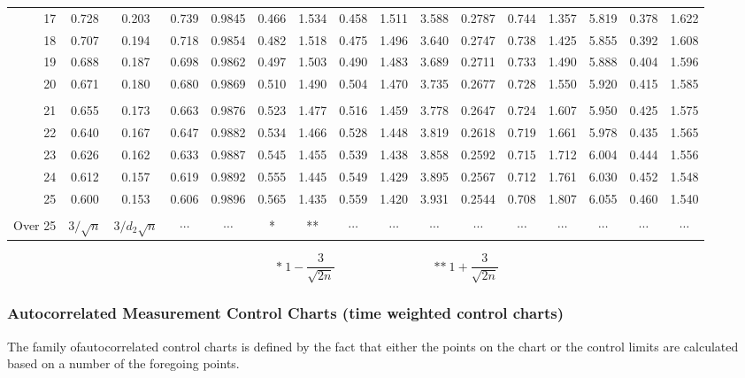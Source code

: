 \begin{center}
{\begin{tabular}{|r|c|c|c|c|c|c|c|c|c|c|c|c|c|c|c|}
	    17 & 0.728 & 0.203 & 0.739 & 0.9845 & 0.466 & 1.534 & 0.458 & 1.511
	       & 3.588 & 0.2787 & 0.744 & 1.357 & 5.819 & 0.378 & 1.622 \\
	    18 & 0.707 & 0.194 & 0.718 & 0.9854 & 0.482 & 1.518 & 0.475 & 1.496
	       & 3.640 & 0.2747 & 0.738 & 1.425 & 5.855 & 0.392 & 1.608 \\
	    19 & 0.688 & 0.187 & 0.698 & 0.9862 & 0.497 & 1.503 & 0.490 & 1.483
	       & 3.689 & 0.2711 & 0.733 & 1.490 & 5.888 & 0.404 & 1.596 \\
	    20 & 0.671 & 0.180 & 0.680 & 0.9869 & 0.510 & 1.490 & 0.504 & 1.470
	       & 3.735 & 0.2677 & 0.728 & 1.550 & 5.920 & 0.415 & 1.585 \\
	       &       &        &       &       &       &       &       &
	       &       &        &       &       &       &       &       \\
	    21 & 0.655 & 0.173 & 0.663 & 0.9876 & 0.523 & 1.477 & 0.516 & 1.459
	       & 3.778 & 0.2647 & 0.724 & 1.607 & 5.950 & 0.425 & 1.575 \\
	    22 & 0.640 & 0.167 & 0.647 & 0.9882 & 0.534 & 1.466 & 0.528 & 1.448
	       & 3.819 & 0.2618 & 0.719 & 1.661 & 5.978 & 0.435 & 1.565 \\
	    23 & 0.626 & 0.162 & 0.633 & 0.9887 & 0.545 & 1.455 & 0.539 & 1.438
	       & 3.858 & 0.2592 & 0.715 & 1.712 & 6.004 & 0.444 & 1.556 \\
	    24 & 0.612 & 0.157 & 0.619 & 0.9892 & 0.555 & 1.445 & 0.549 & 1.429
	       & 3.895 & 0.2567 & 0.712 & 1.761 & 6.030 & 0.452 & 1.548 \\
	    25 & 0.600 & 0.153 & 0.606 & 0.9896 & 0.565 & 1.435 & 0.559 & 1.420
	       & 3.931 & 0.2544 & 0.708 & 1.807 & 6.055 & 0.460 & 1.540 \\
	       &       &        &       &       &       &       &       &
	       &       &        &       &       &       &       &       \\
	    Over 25 & $3/\sqrt{n}$ & $3/d_2\sqrt{n}$ & $\cdots$ & $\cdots$ & * & ** 
	       & $\cdots$ & $\cdots$ & $\cdots$ & $\cdots$ & $\cdots$ & $\cdots$ 
	       & $\cdots$ & $\cdots$ & $\cdots$ \\ \hline
	  \end{tabular}}
	  \[ *\ 1-\frac{3}{\sqrt{2n}} \qquad\qquad\qquad\qquad
	     \text{**}\ 1+\frac{3}{\sqrt{2n}} \]
	\end{center}
	
	\pagebreak
	\subsubsection{Autocorrelated Measurement Control Charts (time weighted control charts)}\label{autocorrelated measurement control charts}
	The family ofautocorrelated control charts is defined by the fact that either the points on the chart or the control limits are calculated based on a number of the foregoing points.

